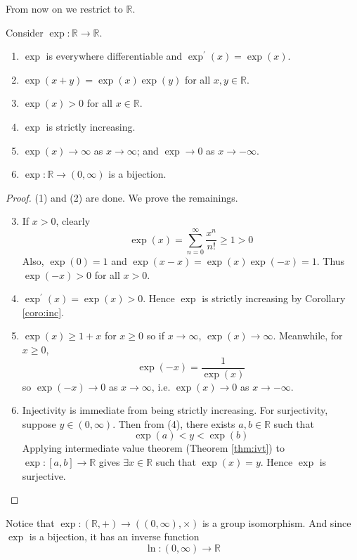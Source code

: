 \documentclass[10pt, a4paper, twoside]{report}
\begin{document}
From now on we restrict to \(\mathbb{R}\).
\begin{theorem}
    Consider \(\exp:\mathbb{R}\to\mathbb{R}\).
    \begin{enumerate}
        \item \(\exp\) is everywhere differentiable and \(\exp^\prime(x)=\exp(x)\).
        \item \(\exp(x+y)=\exp(x)\exp(y)\) for all \(x,y\in\mathbb{R}\).
        \item \(\exp(x)>0\) for all \(x\in\mathbb{R}\).
        \item \(\exp\) is strictly increasing.
        \item \(\exp(x)\to\infty\) as \(x\to\infty\); and \(\exp\to 0\) as \(x\to-\infty\).
        \item \(\exp:\mathbb{R}\to(0,\infty)\) is a bijection.
    \end{enumerate}
    \label{thm:exp_property}
\end{theorem}
\begin{proof}
    (1) and (2) are done. We prove the remainings.
    \begin{enumerate}
        \setcounter{enumi}{2}
        \item If \(x>0\), clearly 
        \[\exp(x)=\sum_{n=0}^{\infty}\frac{x^n}{n!}\geq 1>0\]
        Also, \(\exp(0)=1\) and \(\exp(x-x)=\exp(x)\exp(-x)=1\).
        Thus \(\exp(-x)>0\) for all \(x>0\).
        \item \(\exp^\prime(x)=\exp(x)>0\). Hence \(\exp\) is strictly increasing by Corollary \ref{coro:inc}.
        \item \(\exp(x)\geq 1+x\) for \(x\geq 0\) so if \(x\to\infty\), \(\exp(x)\to\infty\).
        Meanwhile, for \(x\geq 0\),
        \[\exp(-x)=\frac{1}{\exp(x)}\]
        so \(\exp(-x)\to 0\) as \(x\to\infty\), i.e. \(\exp(x)\to 0\) as \(x\to-\infty\).
        \item Injectivity is immediate from being strictly increasing. For surjectivity, suppose \(y\in(0,\infty)\). Then from (4), there exists \(a,b\in\mathbb{R}\) such that 
        \[\exp(a)<y<\exp(b)\]
        Applying intermediate value theorem (Theorem \ref{thm:ivt}) to \(\exp:[a,b]\to\mathbb{R}\) gives \(\exists x\in\mathbb{R}\) such that \(\exp(x)=y\). Hence \(\exp\) is surjective.
    \end{enumerate}
\end{proof}
Notice that \(\exp:(\mathbb{R},+)\to((0,\infty),\times)\) is a group isomorphism. And since \(\exp\) is a bijection, it has an inverse function
\[\ln:(0,\infty)\to\mathbb{R}\]
\end{document}
